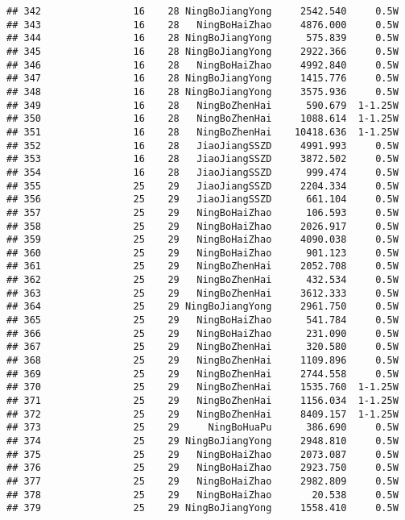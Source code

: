 \documentclass[]{article}
\begin{document}
\begin{verbatim}
## 342                16    28 NingBoJiangYong     2542.540     0.5W
## 343                16    28   NingBoHaiZhao     4876.000     0.5W
## 344                16    28 NingBoJiangYong      575.839     0.5W
## 345                16    28 NingBoJiangYong     2922.366     0.5W
## 346                16    28   NingBoHaiZhao     4992.840     0.5W
## 347                16    28 NingBoJiangYong     1415.776     0.5W
## 348                16    28 NingBoJiangYong     3575.936     0.5W
## 349                16    28   NingBoZhenHai      590.679  1-1.25W
## 350                16    28   NingBoZhenHai     1088.614  1-1.25W
## 351                16    28   NingBoZhenHai    10418.636  1-1.25W
## 352                16    28   JiaoJiangSSZD     4991.993     0.5W
## 353                16    28   JiaoJiangSSZD     3872.502     0.5W
## 354                16    28   JiaoJiangSSZD      999.474     0.5W
## 355                25    29   JiaoJiangSSZD     2204.334     0.5W
## 356                25    29   JiaoJiangSSZD      661.104     0.5W
## 357                25    29   NingBoHaiZhao      106.593     0.5W
## 358                25    29   NingBoHaiZhao     2026.917     0.5W
## 359                25    29   NingBoHaiZhao     4090.038     0.5W
## 360                25    29   NingBoHaiZhao      901.123     0.5W
## 361                25    29   NingBoZhenHai     2052.708     0.5W
## 362                25    29   NingBoZhenHai      432.534     0.5W
## 363                25    29   NingBoZhenHai     3612.333     0.5W
## 364                25    29 NingBoJiangYong     2961.750     0.5W
## 365                25    29   NingBoHaiZhao      541.784     0.5W
## 366                25    29   NingBoHaiZhao      231.090     0.5W
## 367                25    29   NingBoZhenHai      320.580     0.5W
## 368                25    29   NingBoZhenHai     1109.896     0.5W
## 369                25    29   NingBoZhenHai     2744.558     0.5W
## 370                25    29   NingBoZhenHai     1535.760  1-1.25W
## 371                25    29   NingBoZhenHai     1156.034  1-1.25W
## 372                25    29   NingBoZhenHai     8409.157  1-1.25W
## 373                25    29     NingBoHuaPu      386.690     0.5W
## 374                25    29 NingBoJiangYong     2948.810     0.5W
## 375                25    29   NingBoHaiZhao     2073.087     0.5W
## 376                25    29   NingBoHaiZhao     2923.750     0.5W
## 377                25    29   NingBoHaiZhao     2982.809     0.5W
## 378                25    29   NingBoHaiZhao       20.538     0.5W
## 379                25    29 NingBoJiangYong     1558.410     0.5W

\end{verbatim}
\end{document}

